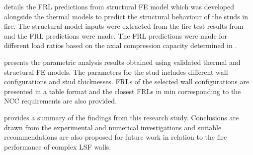 \textbf{} details the FRL predictions from structural FE model which was developed alongside the thermal models to predict the structural behaviour of the studs in fire. The structural model inputs were extracted from the fire test results from  and the FRL predictions were made. The FRL predictions were made for different load ratios based on the axial compression capacity determined in .

\textbf{} presents the parametric analysis results obtained using validated thermal and structural FE models. The parameters for the stud includes different wall configurations and stud thicknesses. FRLs of the selected wall configurations are presented in a table format and the closest FRLs in min corresponding to the NCC requirements are also provided. 


\textbf{} provides a summary of the findings from this research study. Conclusions are drawn from the experimental and numerical investigations and suitable recommendations are also proposed for future work in relation to the fire performance of complex LSF walls.

